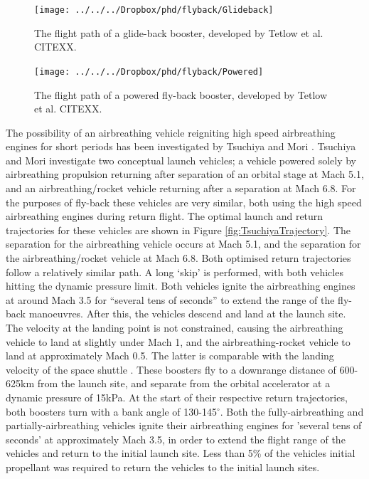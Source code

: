\begin{figure}
\centering
\texttt{[image: ../../../Dropbox/phd/flyback/Glideback]}
\caption{The flight path of a glide-back booster, developed by Tetlow et al. CITEXX.}
\label{fig:Glideback}
\end{figure}

\begin{figure}
\centering
\texttt{[image: ../../../Dropbox/phd/flyback/Powered]}
\caption{The flight path of a powered fly-back booster, developed by Tetlow et al. CITEXX.}
\label{fig:Powered}
\end{figure}


The possibility of an airbreathing vehicle reigniting high speed airbreathing engines for short periods has been investigated by Tsuchiya and Mori \cite{Tsuchiya2005}.  Tsuchiya and Mori investigate two conceptual launch vehicles; a vehicle powered solely by airbreathing propulsion returning after separation of an orbital stage at Mach 5.1, and an airbreathing/rocket vehicle returning after a separation at Mach 6.8\cite{Tsuchiya2005}.  For the purposes of fly-back these vehicles are very similar, both using the high speed airbreathing engines during return flight. The optimal launch and return trajectories for these vehicles are shown in Figure \ref{fig:TsuchiyaTrajectory}. The separation for the airbreathing vehicle occurs at Mach 5.1, and the separation for the airbreathing/rocket vehicle at Mach 6.8. Both optimised return trajectories follow a relatively similar path. A long ‘skip’ is performed, with both vehicles hitting the dynamic pressure limit. Both vehicles ignite the airbreathing engines at around Mach 3.5 for “several tens of seconds” to extend the range of the fly-back manoeuvres. After this, the vehicles descend and land at the launch site. The velocity at the landing point is not constrained, causing the airbreathing vehicle to land at slightly under Mach 1, and the airbreathing-rocket vehicle to land at approximately Mach 0.5. The latter is comparable with the landing velocity of the space shuttle \cite{Romere1983}. 
These boosters fly to a downrange distance of 600-625km from the launch site, and separate from the orbital accelerator at a dynamic pressure of 15kPa\cite{Tsuchiya2005}. At the start of their respective return trajectories, both boosters turn with a bank angle of 130-145$^\circ$. Both the fully-airbreathing and partially-airbreathing vehicles ignite their airbreathing engines for 'several tens of seconds' at approximately Mach 3.5, in order to extend the flight range of the vehicles and return to the initial launch site\cite{Tsuchiya2005}. Less than 5\% of the vehicles initial propellant was required to return the vehicles to the initial launch sites\cite{Tsuchiya2005}.

